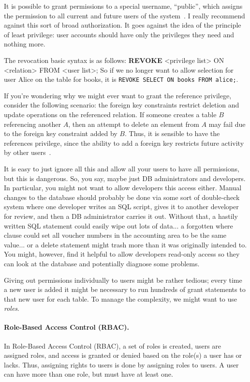 It is possible to grant permissions to a special username, ``public'', which assigns the permission to all current and future users of the system~\cite{dsc}. I really recommend against this sort of broad authorization. It goes against the idea of the principle of least privilege: user accounts should have only the privileges they need and nothing more.

The revocation basic syntax is as follows: \textbf{REVOKE} <privilege list> ON <relation> FROM <user list>; So if we no longer want to allow selection for user Alice on the table for books, it is \texttt{REVOKE SELECT ON books FROM alice;}. 

If you're wondering why we might ever want to grant the reference privilege, consider the following scenario: the foreign key constraints restrict deletion and update operations on the referenced relation. If someone creates a table $B$ referencing another $A$, then an attempt to delete an element from $A$ may fail due to the foreign key constraint added by $B$. Thus, it is sensible to have the references privilege, since the ability to add a foreign key restricts future activity by other users~\cite{dsc}.

It is easy to just ignore all this and allow all your users to have all permissions, but this is dangerous. So, you say, maybe just DB administrators and developers. In particular, you might not want to allow developers this access either. Manual changes to the database should probably be done via some sort of double-check system where one developer writes an SQL script, gives it to another developer for review, and then a DB administrator carries it out. Without that, a hastily written SQL statement could easily wipe out lots of data... a forgotten where clause could set all voucher numbers in the accounting area to be the same value... or a delete statement might trash more than it was originally intended to. You might, however, find it helpful to allow developers read-only access so they can look at the database and potentially diagnose some problems.

Giving out permissions individually to users might be rather tedious; every time a new user is added it might be necessary to run hundreds of grant statements to that new user for each table. To manage the complexity, we might want to use \textit{roles}. 

\paragraph{Role-Based Access Control (RBAC).} In Role-Based Access Control (RBAC), a set of roles is created, users are assigned roles, and access is granted or denied based on the role(s) a user has or lacks. Thus, assigning rights to users is done by assigning roles to users. A user can have more than one role, but must have at least one.

